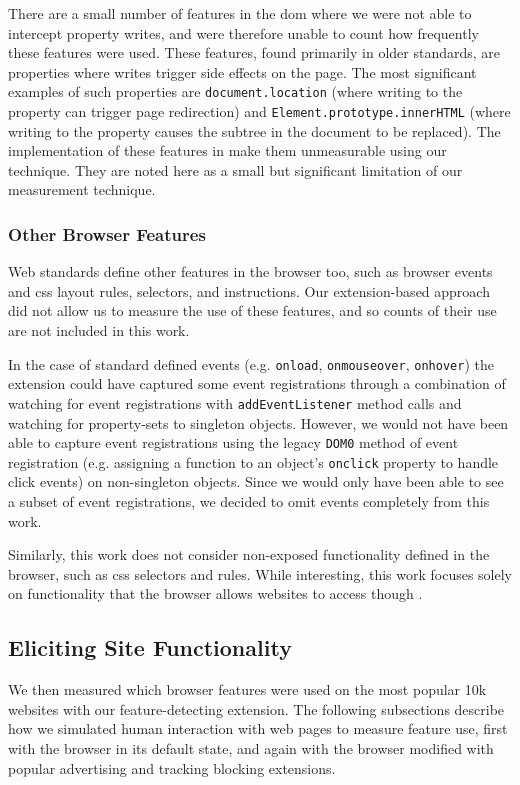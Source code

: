 There are a small number of features in the \gls{dom} where we were not able to
intercept property writes, and were therefore unable to count how frequently
these features were used.  These features, found primarily in older standards,
are properties where writes trigger side effects on the page.  The most
significant examples of such properties are \texttt{document.location} (where
writing to the property can trigger page redirection) and
\texttt{Element.prototype.innerHTML} (where writing to the property causes the
subtree in the document to be replaced).  The implementation of these features
in \FF make them unmeasurable using our technique.  They are noted here as a
small but significant limitation of our measurement technique.


\subsubsection{Other Browser Features}
Web standards define other features in the browser too, such as browser events
and \gls{css} layout rules, selectors, and instructions.  Our extension-based
approach did not allow us to measure the use of these features, and so counts
of their use are not included in this work.

In the case of standard defined events (e.g. \texttt{onload},
\texttt{onmouseover}, \texttt{onhover}) the extension could have
captured some event registrations through a combination of watching for
event registrations with \texttt{addEventListener} method calls
and watching for property-sets to singleton objects.  However, we would not
have been able to capture event registrations using the legacy \texttt{DOM0}
method of event registration (e.g. assigning a function to an object's
\texttt{onclick} property to handle click events) on non-singleton objects.
Since we would only have been able to see a subset of event registrations,
we decided to omit events completely from this work.

Similarly, this work does not consider non-\JS exposed functionality defined in
the browser, such as \gls{css} selectors and rules.  While interesting, this
work focuses solely on functionality that the browser allows websites to access
though \JS.


\subsection{Eliciting Site Functionality}
\label{measurement:methodology:eliciting-site-functionality}
We then measured which browser features were used on the most popular 10k
websites with our feature-detecting extension.  The following subsections
describe how we simulated human interaction with web pages to measure feature
use, first with the browser in its default state, and again with the browser
modified with popular advertising and tracking blocking extensions.


